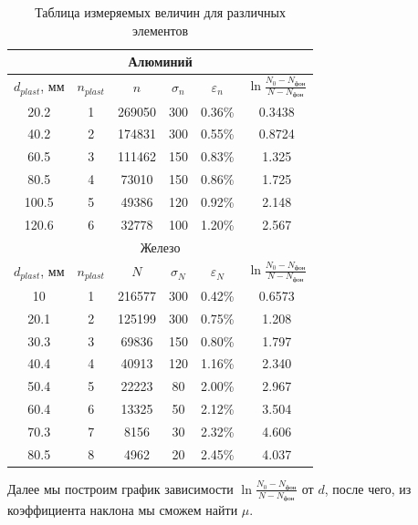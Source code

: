 \documentclass[a4paper,12pt]{extarticle}
\begin{document}
\begin{table}[H]
\begin{center}
\begin{tabular}{|c|c|c|c|c|c|}
\hline
\multicolumn{6}{|c|}{Алюминий}\\ \hline
$d_{plast}$, мм & $n_{plast}$ & $n$   & $\sigma_n$ & $\varepsilon_n$ & $\ln{\frac{N_0-N_{\text{фон}}}{N- N_{\text{фон}}}}$\\ \hline
20.2& 1           & 269050& 300& 0.36\%& 0.3438\\ \hline
40.2& 2           & 174831& 300& 0.55\%& 0.8724\\ \hline
60.5& 3           & 111462& 150& 0.83\%& 1.325\\ \hline
80.5& 4           & 73010& 150& 0.86\%& 1.725\\ \hline
100.5& 5           & 49386& 120& 0.92\%& 2.148\\\hline
 120.6& 6& 32778& 100& 1.20\%& 2.567\\\hline 
\multicolumn{6}{|c|}{Железо}\\ \hline
$d_{plast}$, мм & $n_{plast}$ & $N$& $\sigma_N$& $\varepsilon_N$& $\ln{\frac{N_0-N_{\text{фон}}}{N- N_{\text{фон}}}}$\\ \hline
10& 1           & 216577& 300& 0.42\%& 0.6573\\ \hline
20.1& 2           & 125199& 300& 0.75\%& 1.208\\ \hline
30.3& 3           & 69836& 150& 0.80\%& 1.797\\ \hline
40.4& 4           & 40913& 120& 1.16\%& 2.340\\ \hline
50.4& 5           & 22223& 80& 2.00\%& 2.967\\ \hline
 60.4& 6& 13325& 50& 2.12\%& 3.504\\\hline
 70.3& 7& 8156& 30& 2.32\%& 4.606\\\hline
 80.5& 8& 4962& 20& 2.45\%& 4.037\\\hline
\end{tabular}
\caption{Таблица измеряемых величин для различных элементов}
\end{center}
\end{table}

Далее мы построим график зависимости $\ln{\frac{N_0-N_{\text{фон}}}{N- N_{\text{фон}}}}$ от $d$, после чего, из коэффициента наклона мы сможем найти $\mu$.
\end{document}
